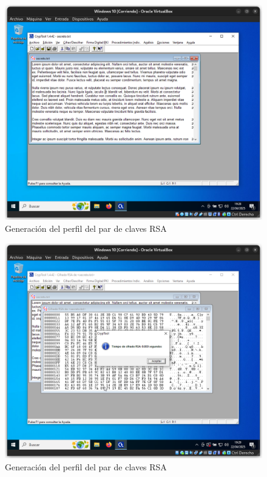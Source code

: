\begin{figure}[H]
    \includegraphics[width=15cm]{EncriptadoRSA-1}
    \caption{Generación del perfil del par de claves RSA}
\end{figure}

\begin{figure}[H]
    \includegraphics[width=15cm]{EncriptadoRSA-2}
    \caption{Generación del perfil del par de claves RSA}
\end{figure}


